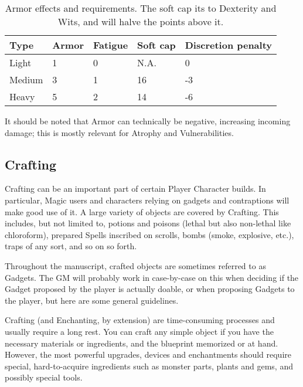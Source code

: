 \begin{table}[h!tbp]
	\begin{center}
		\begin{tabular}{p{1.2cm}p{1.1cm}p{1.2cm}p{1cm}p{1.7cm}} \toprule
			
			\textbf{Type} & \textbf{Armor} & \textbf{Fatigue} & \textbf{Soft cap} & \textbf{Discretion penalty} \\ \midrule
			
			Light & 1 & 0 & N.A. & 0\\
			Medium & 3 & 1 & 16 & -3 \\
			Heavy & 5 & 2 & 14 & -6 \\

			\bottomrule
		\end{tabular}
	\end{center}
	\caption{Armor effects and requirements. The soft cap its to Dexterity and Wits, and will halve the points above it.}
	\label{armor_effects}
\end{table}



It should be noted that Armor can technically be negative, increasing incoming damage; this is mostly relevant for Atrophy and Vulnerabilities.


\subsection{Crafting}

Crafting can be an important part of certain Player Character builds. In particular, Magic users and characters relying on gadgets and contraptions will make good use of it. A large variety of objects are covered by Crafting. This includes, but not limited to, potions and poisons (lethal but also non-lethal like chloroform), prepared Spells inscribed on scrolls, bombs (smoke, explosive, etc.), traps of any sort, and so on so forth.

Throughout the manuscript, crafted objects are sometimes referred to as Gadgets. The GM will probably work in case-by-case on this when deciding if the Gadget proposed by the player is actually doable, or when proposing Gadgets to the player, but here are some general guidelines. 

\label{crafting}

Crafting (and Enchanting, by extension) are time-consuming processes and usually require a long rest. You can craft any simple object if you have the necessary materials or ingredients, and the blueprint memorized or at hand. However, the most powerful upgrades, devices and enchantments should require special, hard-to-acquire ingredients such as monster parts, plants and gems, and possibly special tools. 

